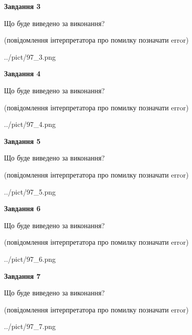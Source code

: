 \documentclass[12pt, ukrainian]{article}
\begin{document}
{\begin {large}
{\begin {center}\textbf{Завдання 3}\end {center}}\par
Що буде виведено за виконання?\par
 (повідомлення інтерпретатора про помилку позначати error)\par
\begin{center}
	{../pict/97_3.png}
\end{center}
\newpage

{\begin {center}\textbf{Завдання 4}\end {center}}\par
Що буде виведено за виконання?\par
 (повідомлення інтерпретатора про помилку позначати error)\par
\begin{center}
	{../pict/97_4.png}
\end{center}
\newpage

{\begin {center}\textbf{Завдання 5}\end {center}}\par
Що буде виведено за виконання?\par
 (повідомлення інтерпретатора про помилку позначати error)\par
\begin{center}
	{../pict/97_5.png}
\end{center}
\newpage

{\begin {center}\textbf{Завдання 6}\end {center}}\par
Що буде виведено за виконання?\par
 (повідомлення інтерпретатора про помилку позначати error)\par
\begin{center}
	{../pict/97_6.png}
\end{center}
\newpage

{\begin {center}\textbf{Завдання 7}\end {center}}\par
Що буде виведено за виконання?\par
 (повідомлення інтерпретатора про помилку позначати error)\par
\begin{center}
	{../pict/97_7.png}
\end{center}
\newpage


\end{large}}
\end{document}
